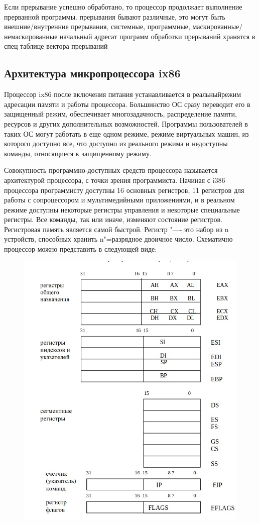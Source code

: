 Если прерывание успешно обработано, то процессор продолжает выполнение прерванной программы.
прерывания бывают различные, это могут быть внешние/внутренние прерывания, системные, программные, маскированные/немаскированные
начальный адресат программ обработки прерываний хранятся в спец таблице вектора прерываний

\subsection{Архитектура микропроцессора ix86}

Процессор ix86 после включения питания устанавливается в реальныйрежим адресации памяти и работы процессора. 
Большинство ОС сразу переводит его в защищенный режим, обеспечивает многозадачность, распределение памяти, ресурсов и других дополнительных возможностей. 
Программы пользователей в таких ОС могут работать в еще одном режиме, 
режиме виртуальных машин, из которого доступно все, что доступно из реального режима и недоступны команды, относящиеся к защищенному режиму.

Совокупность программно-доступных средств процессора называется архитектурой процессора, с точки зрения программиста.
Начиная с i386 процессора программисту доступны 16 основных регистров, 11 регистров для работы с сопроцессором и мультимедийными приложениями, 
и в реальном режиме доступны некоторые регистры управления и некоторые специальные регистры.
Все команды, так или иначе, изменяют состояние регистров. Регистровая память является самой быстрой. 
Регистр "---- это набор из n устройств, способных хранить n"=разрядное двоичное число.
Схематично процессор можно представить в следующей виде:
\begin{figure}[H]
    \centering
    \includegraphics[scale = 0.5]{processor.jpeg}
\end{figure}

